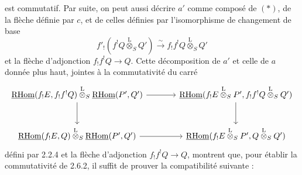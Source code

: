 \documentclass[11pt]{article}
\newcommand{\R}{\mathrm{R}}\newcommand{\RHomCore}{\mathrm{RHom}}
\providecommand{\RHom}{\RHomCore}
\providecommand{\uRHom}{\underline{\RHom}}
\providecommand{\RHom}{\RHomCore}
\providecommand{\RHom}{\R\mathcal{H}om}
\providecommand{\R}{\mathrm R}
\providecommand{\RHom}{\RHomCore}
\begin{document}
est commutatif. Par suite, on peut aussi décrire $a'$ comme composé de $(*)$, de la flèche définie par $c$, et de celles définies par l'isomorphisme de changement de base
\[
f'_!(f^!Q\overset{\mathrm{L}}{\otimes}_SQ')\xrightarrow{\sim}f_!f^!Q\overset{\mathrm{L}}{\otimes}_SQ'
\]
et la flèche d'adjonction $f_!f^!Q\to Q$. Cette décomposition de $a'$ et celle de $a$ donnée plus haut, jointes à la commutativité du carré
\[
\begin{tikzcd}[column sep=
large,row sep=large]
\uRHom(f_!E,f_!f^!Q)\overset{\mathrm{L}}{\otimes}_S\uRHom(P',Q') \arrow[r] \arrow[d] & \uRHom(f_!E\overset{\mathrm{L}}{\otimes}_SP',f_!f^!Q\overset{\mathrm{L}}{\otimes}_SQ') \arrow[d]\\
\uRHom(f_!E,Q)\overset{\mathrm{L}}{\otimes}_S\uRHom(P',Q') \arrow[r] & \uRHom(f_!E\overset{\mathrm{L}}{\otimes}_SP',Q\overset{\mathrm{L}}{\otimes}_SQ')
\end{tikzcd}
\]
défini par 2.2.4 et la flèche d'adjonction $f_!f^!Q\to Q$, montrent que, pour établir la commutativité de 2.6.2, il suffit de prouver la compatibilité suivante :
\end{document}
